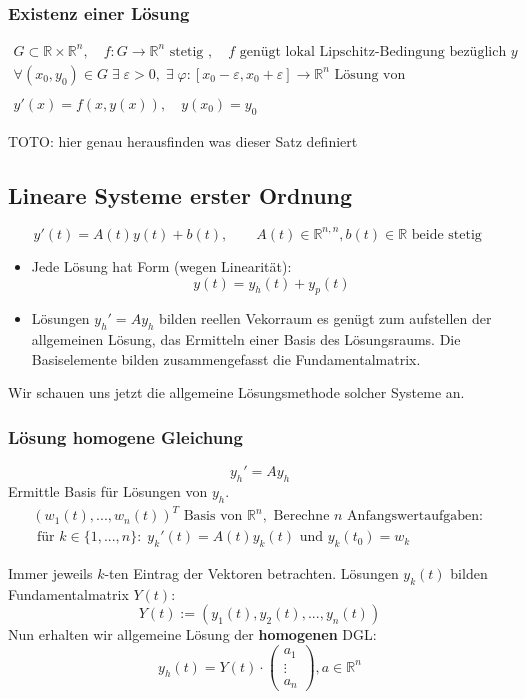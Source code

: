 \documentclass[a4paper]{article}
\newcommand{\R}{\mathbb{R}}
\begin{document}
\subsubsection{Existenz einer Lösung}
\begin{gather*}
	G\subset \R \times \R ^{n}, \quad
	f: G \rightarrow \R ^{n} \text{ stetig }, \quad
	f \text{ genügt lokal Lipschitz-Bedingung bezüglich } y \\
	\forall (x_0, y_0) \in G \; \exists \; \varepsilon > 0, \;
	\exists \; \varphi : [x_0 - \varepsilon, x_0 + \varepsilon] \rightarrow \R ^{n}
	\text{ Lösung von } \\
	\\
	y' (x) = f(x, y(x)), \quad y(x_0) = y_0
\end{gather*}

TOTO: hier genau herausfinden was dieser Satz definiert

\subsection{Lineare Systeme erster Ordnung}
\[
	y'(t) = A(t) y(t) +b(t), \qquad
	A(t) \in \R ^{n,n}, b(t) \in \R
	\text{ beide stetig }
\] 

\begin{itemize}
	\item Jede Lösung hat Form (wegen Linearität):
		\[
			y(t) = y_h (t) + y_p (t)
		\] 
	\item Lösungen $y_h ' = A y_h$ bilden reellen Vekorraum
		es genügt zum aufstellen der allgemeinen Lösung, das Ermitteln einer
		Basis des Lösungsraums. Die Basiselemente bilden zusammengefasst
		die Fundamentalmatrix.
\end{itemize}

Wir schauen uns jetzt die allgemeine Lösungsmethode solcher
Systeme an.

\subsubsection{Lösung homogene Gleichung}
\[
	y_h ' = A y_h
\]
Ermittle Basis für Lösungen von $y_h$.
\begin{gather*}
	(w_1(t), ..., w_{n} (t)) ^{T} \text{ Basis von } \R ^{n},
	\text{ Berechne $n$ Anfangswertaufgaben: } \\
	\text{ für } k \in \{
		1, ..., n
	\}: \;
	y_{k}' (t) = A(t) y_{k} (t) \text{ und }
	y_k (t_0) = w_k
\end{gather*}

Immer jeweils $k$-ten Eintrag der Vektoren betrachten.
Lösungen $y_k (t)$ bilden Fundamentalmatrix $Y(t)$:
\[
	Y(t) := (y_1 (t), y_2 (t), ..., y_n (t))
\] 
Nun erhalten wir allgemeine Lösung der \textbf{homogenen} DGL:
\[
	y_h (t) = Y(t) \cdot \begin{pmatrix} a_1 \\ \vdots \\ a_n \end{pmatrix},
	a \in \R ^{n}
\]
\end{document}
